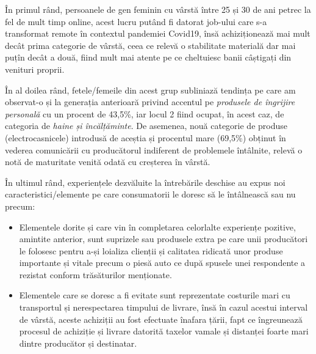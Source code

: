 \documentclass[a4paper, 12pt]{article}
\begin{document}
\begin{itemize}
		\quad În primul rând, persoanele de gen feminin cu vârstă între 25 și 30 de ani petrec la fel de mult timp online, acest lucru putând fi datorat job-ului care s-a transformat remote în contextul pandemiei Covid19, însă achiziționează mai mult decât prima categorie de vârstă, ceea ce relevă o stabilitate materială dar mai puțîn decât a două, fiind mult mai atente pe ce cheltuiesc banii câștigați din venituri proprii.
		
		\quad În al doilea rând, fetele/femeile din acest grup subliniază tendința pe care am observat-o și la generația anterioară privind accentul pe \textit{produsele de îngrijire personală} cu un procent de 43,5\%, iar locul 2 fiind ocupat, în acest caz, de categoria de \textit{haine și încălțăminte}. De asemenea, nouă categorie de produse (electrocasnicele)  introdusă de aceștia și procentul mare (69,5\%) obținut în vederea comunicării cu producătorul indiferent de problemele întâlnite, relevă o notă de maturitate venită odată cu creșterea în vârstă.
		
		\quad În ultimul rând, experiențele dezvăluite la întrebările deschise au expus noi caracteristici/elemente pe care consumatorii le doresc să le întâlnească sau nu precum:
		\begin{itemize}
			\item Elementele dorite și care vin în completarea celorlalte experiențe pozitive, amintite anterior, sunt suprizele sau produsele extra pe care unii producători le folosesc pentru a-și loializa clienții și  calitatea ridicată unor produse importante și vitale precum o piesă auto ce după spusele unei respondente a rezistat conform trăsăturilor menționate.
			\item Elementele care se doresc a fi evitate sunt reprezentate costurile mari cu transportul și nerespectarea timpului de livrare, însă în cazul acestui interval de vârstă, aceste achiziții au fost efectuate înafara țării, fapt ce îngreunează procesul de achiziție și livrare datorită taxelor vamale și distanței foarte mari dintre producător și destinatar.
		\end{itemize}
	\end{itemize}
\newpage	
\end{document}
